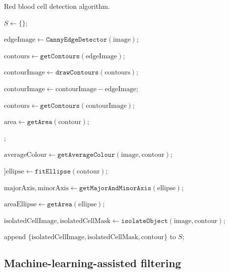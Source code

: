 \begin{algorithm}[!ht]
    \caption{Red blood cell detection algorithm.}\label{alg:rbc-detection}


    $S \gets \{\}$;

    $\mathrm{edgeImage} \gets \texttt{CannyEdgeDetector}(\mathrm{image})$;

    $\mathrm{contours} \gets \texttt{getContours}(\mathrm{edgeImage})$;

    $\mathrm{contourImage} \gets \texttt{drawContours}(\mathrm{contours})$;

    $\mathrm{contourImage} \gets \mathrm{contourImage} - \mathrm{edgeImage}$;

    $\mathrm{contours} \gets \texttt{getContours}(\mathrm{contourImage})$;

     {
        $\mathrm{area} \gets \texttt{getArea}(\mathrm{contour})$;

        ;
        {
            $\mathrm{averageColour} \gets \texttt{getAverageColour}(\mathrm{image},\mathrm{contour})$;

            {
                $]\mathrm{ellipse} \gets \texttt{fitEllipse}(\mathrm{contour})$;

                $\mathrm{majorAxis},\mathrm{minorAxis} \gets \texttt{getMajorAndMinorAxis}(\mathrm{ellipse})$;

                $\mathrm{areaEllipse} \gets \texttt{getArea}(\mathrm{ellipse})$;

                {
                    $\mathrm{isolatedCellImage},\mathrm{isolatedCellMask} \gets \texttt{isolateObject}(\mathrm{image},\mathrm{contour})$;

                    append $\{\mathrm{isolatedCellImage},\mathrm{isolatedCellMask},\mathrm{contour}\}$ to $S$;
                }
            }
        }
    }
\end{algorithm}    

\subsection{Machine-learning-assisted filtering}

